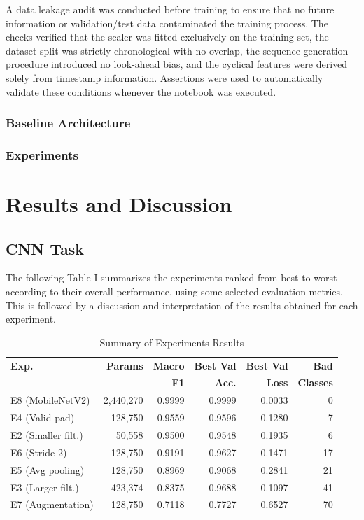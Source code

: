 \documentclass[conference]{IEEEtran}
\begin{document}
\bigbreak

A data leakage audit was conducted before training to ensure that no future information or validation/test data contaminated the training process. The checks verified that the scaler was fitted exclusively on the training set, the dataset split was strictly chronological with no overlap, the sequence generation procedure introduced no look-ahead bias, and the cyclical features were derived solely from timestamp information. Assertions were used to automatically validate these conditions whenever the notebook was executed.

\subsubsection{Baseline Architecture}

\subsubsection{Experiments}



\section{Results and Discussion}


\subsection{CNN Task}

The following Table I summarizes the experiments ranked from best to worst according to their overall performance, using some selected evaluation metrics. This is followed by a discussion and interpretation of the results obtained for each experiment.

\begin{table}[h]
\centering
\caption{Summary of Experiments Results}
\label{tab:cnn_results}
\begin{tabular}{@{}lrrrrr@{}}
\toprule
\textbf{Exp.} & \textbf{Params} & \textbf{Macro} & \textbf{Best Val} & \textbf{Best Val} & \textbf{Bad} \\
 & & \textbf{F1} & \textbf{Acc.} & \textbf{Loss} & \textbf{Classes} \\
\midrule
E8 (MobileNetV2) & 2,440,270 & 0.9999 & 0.9999 & 0.0033 & 0 \\
E4 (Valid pad)   & 128,750   & 0.9559 & 0.9596 & 0.1280 & 7 \\
E2 (Smaller filt.) & 50,558  & 0.9500 & 0.9548 & 0.1935 & 6 \\
E6 (Stride 2)    & 128,750   & 0.9191 & 0.9627 & 0.1471 & 17 \\
E5 (Avg pooling) & 128,750   & 0.8969 & 0.9068 & 0.2841 & 21 \\
E3 (Larger filt.) & 423,374  & 0.8375 & 0.9688 & 0.1097 & 41 \\
E7 (Augmentation) & 128,750  & 0.7118 & 0.7727 & 0.6527 & 70 \\
\bottomrule
\end{tabular}
\end{table}
 
\end{document}
